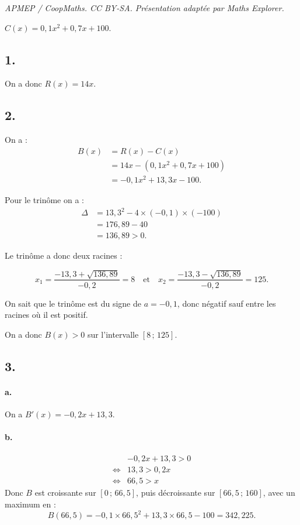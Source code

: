 \documentclass[10pt]{article}
\begin{document}
\noindent\textit{APMEP / CoopMaths. CC BY-SA. Présentation adaptée par Maths Explorer.}\par\medskip
\(C(x) = 0{,}1x^2 + 0{,}7x + 100\).

\subsection*{1.}

On a donc \( R(x) = 14x \).

\subsection*{2.}

On a :
\begin{align*}
B(x) &= R(x) - C(x) \\
&= 14x - (0{,}1x^2 + 0{,}7x + 100) \\
&= -0{,}1x^2 + 13{,}3x - 100.
\end{align*}

Pour le trinôme on a :
\begin{align*}
\Delta &= 13{,}3^2 - 4 \times (-0{,}1) \times (-100) \\
&= 176{,}89 - 40 \\
&= 136{,}89 > 0.
\end{align*}

Le trinôme a donc deux racines :

\[
x_1 = \dfrac{-13{,}3 + \sqrt{136{,}89}}{-0{,}2} = 8 \quad \text{et} \quad x_2 = \dfrac{-13{,}3 - \sqrt{136{,}89}}{-0{,}2} = 125.
\]

On sait que le trinôme est du signe de \( a = -0{,}1 \), donc négatif sauf entre les racines où il est positif. 

On a donc \( B(x) > 0 \) sur l'intervalle \( [8 \,;\, 125] \).

\subsection*{3.}

\paragraph{a.} On a \( B'(x) = -0{,}2x + 13{,}3 \).

\paragraph{b.}
\begin{align*}
&-0{,}2x + 13{,}3 > 0 \\
\iff &13{,}3 > 0{,}2x \\
\iff &66{,}5 > x
\end{align*}
Donc \(B\) est croissante sur \([0 \,;\, 66{,}5]\), puis décroissante sur \([66{,}5 \,;\, 160]\), avec un maximum en :
\[
B(66{,}5) = -0{,}1 \times 66{,}5^2 + 13{,}3 \times 66{,}5 - 100 = 342{,}225.
\]
\end{document}

